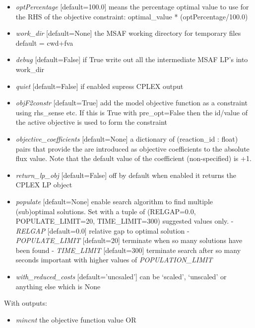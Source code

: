 \documentclass[a4paper,11pt,english]{sphinxmanual}
\begin{document}
\begin{fulllineitems}
\begin{itemize}
\item {} 
\emph{optPercentage} {[}default=100.0{]} means the percentage optimal value to use for the RHS of the objective constraint: optimal\_value * (optPercentage/100.0)

\item {} 
\emph{work\_dir} {[}default=None{]} the MSAF working directory for temporary files default = cwd+fva

\item {} 
\emph{debug} {[}default=False{]} if True write out all the intermediate MSAF LP's into work\_dir

\item {} 
\emph{quiet} {[}default=False{]} if enabled supress CPLEX output

\item {} 
\emph{objF2constr} {[}default=True{]} add the model objective function as a constraint using rhs\_sense etc. If
this is True with pre\_opt=False then the id/value of the active objective is used to form the constraint

\item {} 
\emph{objective\_coefficients} {[}default=None{]} a dictionary of (reaction\_id : float) pairs that provide the are introduced as objective coefficients to the absolute flux value. Note that the default value of the coefficient (non-specified) is +1.

\item {} 
\emph{return\_lp\_obj} {[}default=False{]} off by default when enabled it returns the CPLEX LP object

\item {} 
\emph{populate} {[}default=None{]} enable search algorithm to find multiple (sub)optimal solutions. Set with a tuple of (RELGAP=0.0, POPULATE\_LIMIT=20, TIME\_LIMIT=300) suggested values only.
- \emph{RELGAP} {[}default=0.0{]} relative gap to optimal solution
- \emph{POPULATE\_LIMIT} {[}default=20{]} terminate when so many solutions have been found
- \emph{TIME\_LIMIT} {[}default=300{]} terminate search after so many seconds important with higher values of \emph{POPULATION\_LIMIT}

\item {} 
\emph{with\_reduced\_costs} {[}default='uncsaled'{]} can be `scaled', `unscaled' or anything else which is None

\end{itemize}

With outputs:
\begin{itemize}
\item {} 
\emph{mincnt} the objective function value OR


\end{itemize}
\end{fulllineitems}
\end{document}
